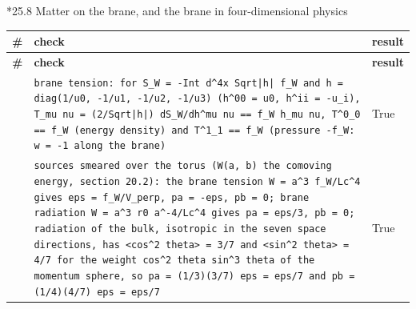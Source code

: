 \documentclass[10pt,a4paper]{article}
\makeatletter
\renewcommand\subsubsection{\@startsection{subsubsection}{3}{\z@}{-3.25ex\@plus -1ex \@minus -.2ex}{1.5ex \@plus .2ex}{\normalfont\normalsize\bfseries\raggedright}}
\makeatother
\begin{document}
\subsubsection*{25.8 Matter on the brane, and the brane in four-dimensional physics}
{\footnotesize
\begin{longtable}{>{\raggedright\arraybackslash}p{}>{\raggedright\arraybackslash}p{}>{\raggedright\arraybackslash}p{}}
\toprule
\textbf{\#} & \textbf{check} & \textbf{result} \\
\midrule\endfirsthead
\toprule
\textbf{\#} & \textbf{check} & \textbf{result} \\
\midrule\endhead
\endfoot
\bottomrule\endlastfoot
444 & \texttt{brane tension: for S\_\allowbreak{}W = -Int d\textasciicircum{}4x Sqrt|h| f\_\allowbreak{}W and h = diag(1/\allowbreak{}u0, -1/\allowbreak{}u1, -1/\allowbreak{}u2, -1/\allowbreak{}u3) (h\textasciicircum{}00 = u0, h\textasciicircum{}ii = -u\_\allowbreak{}i), T\_\allowbreak{}mu nu = (2/\allowbreak{}Sqrt|h|) dS\_\allowbreak{}W/\allowbreak{}dh\textasciicircum{}mu nu == f\_\allowbreak{}W h\_\allowbreak{}mu nu, T\textasciicircum{}0\_\allowbreak{}0 == f\_\allowbreak{}W (energy density) and T\textasciicircum{}1\_\allowbreak{}1 == f\_\allowbreak{}W (pressure -f\_\allowbreak{}W: w = -1 along the brane)} & True \\
445 & \texttt{sources smeared over the torus (W(a, b) the comoving energy, section 20.2): the brane tension W = a\textasciicircum{}3 f\_\allowbreak{}W/\allowbreak{}Lc\textasciicircum{}4 gives eps = f\_\allowbreak{}W/\allowbreak{}V\_\allowbreak{}perp, pa = -eps, pb = 0; brane radiation W = a\textasciicircum{}3 r0 a\textasciicircum{}-4/\allowbreak{}Lc\textasciicircum{}4 gives pa = eps/\allowbreak{}3, pb = 0; radiation of the bulk, isotropic in the seven space directions, has <cos\textasciicircum{}2 theta> = 3/\allowbreak{}7 and <sin\textasciicircum{}2 theta> = 4/\allowbreak{}7 for the weight cos\textasciicircum{}2 theta sin\textasciicircum{}3 theta of the momentum sphere, so pa = (1/\allowbreak{}3)(3/\allowbreak{}7) eps = eps/\allowbreak{}7 and pb = (1/\allowbreak{}4)(4/\allowbreak{}7) eps = eps/\allowbreak{}7} & True \\

\end{longtable}}
\end{document}
